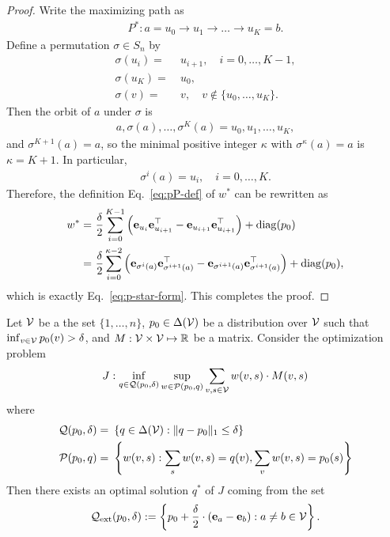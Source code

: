\begin{proof}
Write the maximizing path as
\begin{align*}
    P^*: a=u_0 \to u_1 \to \dots \to u_K=b.
\end{align*}
Define a permutation $\sigma\in S_n$ by
\begin{align*}
    \sigma(u_i) = &~ u_{i+1}, \quad i=0,\dots,K-1,\\
    \sigma(u_K) = &~ u_0,\\
    \sigma(v) = &~ v, \quad v\notin\{u_0,\dots,u_K\}.
\end{align*}
Then the orbit of $a$ under $\sigma$ is
\begin{align*}
    a, \sigma(a), \dots, \sigma^K(a)
    = u_0,u_1,\dots,u_K,
\end{align*}
and $\sigma^{K+1}(a)=a$, so the minimal positive integer
$\kappa$ with $\sigma^\kappa(a)=a$ is $\kappa=K+1$.
In particular,
\begin{align*}
    \sigma^i(a) = u_i,\quad i=0,\dots,K.
\end{align*}
Therefore, the definition Eq.~\eqref{eq:pP-def} of $w^*$ can be rewritten as
\begin{align*}
    w^*
    = &~ \frac{\delta}{2}\sum_{i=0}^{K-1}
        \left(\mathbf{e}_{u_i}\mathbf{e}_{u_{i+1}}^\top
              - \mathbf{e}_{u_{i+1}}\mathbf{e}_{u_{i+1}}^\top\right)
       + \mathrm{diag}(p_0)\\
    = &~ \frac{\delta}{2}\sum_{i=0}^{\kappa-2}
        \left(\mathbf{e}_{\sigma^i(a)}\mathbf{e}_{\sigma^{i+1}(a)}^\top
              - \mathbf{e}_{\sigma^{i+1}(a)}\mathbf{e}_{\sigma^{i+1}(a)}^\top\right)
       + \mathrm{diag}(p_0),
\end{align*}
which is exactly Eq.~\eqref{eq:p-star-form}.  This completes the proof.
\end{proof}


\begin{lemma}\label{lem:middle}
Let $\mathcal{V}$ be a the set $\{1,\dots,n\}$, $p_0 \in \Delta(\mathcal{V})$ be a distribution over $\mathcal{V}$ such that $\inf_{v \in \mathcal{V}}p_0(v) > \delta$, and $M: \mathcal{V} \times \mathcal{V} \mapsto \mathbb{R}$ be a matrix. Consider the optimization problem
\begin{align*}
    J: \inf_{q \in \mathcal{Q}(p_0,\delta)} \sup_{w \in \mathcal{P}(p_0,q)} \sum_{v,s \in \mathcal{V}} w(v,s) \cdot M(v,s)
\end{align*}
where 
\begin{align*}
    \mathcal{Q}(p_0,\delta) = &~ \left\{q \in \Delta(\mathcal{V}): \|q - p_0\|_1 \leq \delta\right\} \\
    \mathcal{P}(p_0,q) = &~ \left\{w(v,s): \sum_{s}w(v,s) = q(v), \sum_vw(v,s) =  p_0(s)\right\}
\end{align*}
Then there exists an optimal solution $q^*$ of $J$ coming from the set 
\begin{align*}
    \mathcal{Q}_{\mathrm{ext}}(p_0,\delta) := \left\{p_0 + \frac{\delta}{2}\cdot (\mathbf{e}_a - \mathbf{e}_b): a \neq b \in \mathcal{V}\right\}.
\end{align*}
\end{lemma}

